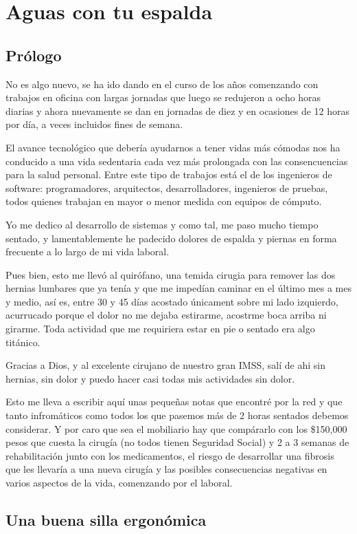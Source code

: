 \chapter{Aguas con tu espalda}
\section{Prólogo}
No es algo nuevo, se ha ido dando en el curso de los años comenzando con trabajos en oficina con largas jornadas que luego se redujeron a ocho horas diarias y ahora nuevamente se dan en jornadas de diez y en ocasiones de 12 horas por día, a veces incluidos fines de semana.

El avance tecnológico que debería ayudarnos a tener vidas más cómodas nos ha conducido a una vida sedentaria cada vez más prolongada con las consencuencias para la salud personal. Entre este tipo de trabajos está el de los ingenieros de software: programadores, arquitectos, desarrolladores, ingenieros de pruebas, todos quienes trabajan en mayor o menor medida con equipos de cómputo.

Yo me dedico al desarrollo de sistemas y como tal, me paso mucho tiempo sentado, y lamentablemente he padecido dolores de espalda y piernas en forma frecuente a lo largo de mi vida laboral.

Pues bien, esto me llevó al quirófano, una temida cirugia para remover las dos hernias lumbares que ya tenía y que me impedían caminar en el último mes a mes y medio, así es, entre 30 y 45 días acostado únicament sobre mi lado izquierdo, acurrucado porque el dolor no me dejaba estirarme, acostrme boca arriba ni girarme. Toda actividad que me requiriera estar en pie o sentado era algo titánico.

Gracias a Dios, y al excelente cirujano de nuestro gran IMSS, salí de ahi sin hernias, sin dolor y puedo hacer casi todas mis actividades sin dolor.

Esto me lleva a escribir aquí unas pequeñas notas que encontré por la red y que tanto infromáticos como todos los que pasemos más de 2 horas sentados debemos considerar. Y por caro que sea el mobiliario hay que compárarlo con los \$150,000 pesos que cuesta la cirugía (no todos tienen Seguridad Social) y 2 a 3 semanas de rehabilitación junto con los medicamentos, el riesgo de desarrollar una fibrosis que les llevaría a una nueva cirugía y las posibles consecuencias negativas en varios aspectos de la vida, comenzando por el laboral.

\section{Una buena silla ergonómica}
